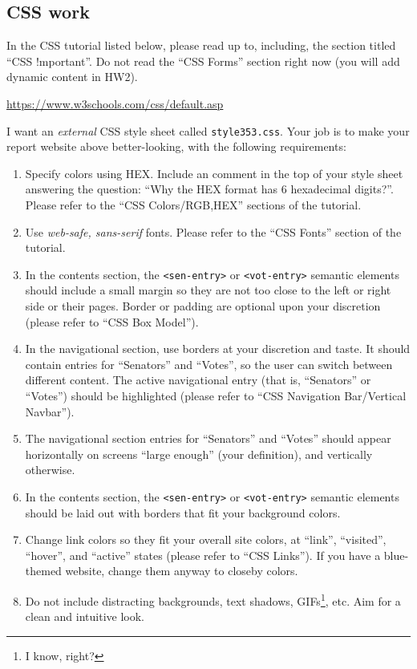 \documentclass[11pt]{article}
\begin{document}
\subsection{CSS work}

In the CSS tutorial listed below, please read up to, including, the section titled ``CSS !mportant''. Do not read the ``CSS Forms'' section right now (you will add dynamic content in HW2).

\begin{center}
	\url{https://www.w3schools.com/css/default.asp}
\end{center}

I want an \emph{external} CSS style sheet called \texttt{style353.css}. Your job is to make your report website above better-looking, with the following requirements:
\begin{enumerate}
	\item Specify colors using HEX. Include an comment in the top of your style sheet answering the question: ``Why the HEX format has 6 hexadecimal digits?''. Please refer to the ``CSS Colors/{RGB,HEX}'' sections of the tutorial.
	\item Use \emph{web-safe, sans-serif} fonts. Please refer to the ``CSS Fonts'' section of the tutorial.
	\item In the contents section, the \texttt{<sen-entry>} or \texttt{<vot-entry>} semantic elements should include a small margin so they are not too close to the left or right side or their pages. Border or padding are optional upon your discretion (please refer to ``CSS Box Model'').
	\item In the navigational section, use borders at your discretion and taste. It should contain entries for ``Senators'' and ``Votes'', so the user can switch between different content. The active navigational entry (that is, ``Senators'' or ``Votes'') should be highlighted (please refer to ``CSS Navigation Bar/Vertical Navbar'').
	\item The navigational section entries for ``Senators'' and ``Votes'' should appear horizontally on screens ``large enough'' (your definition), and vertically otherwise.
	\item In the contents section, the \texttt{<sen-entry>} or \texttt{<vot-entry>} semantic elements should be laid out with borders that fit your background colors.
	\item Change link colors so they fit your overall site colors, at ``link'', ``visited'', ``hover'', and ``active'' states (please refer to ``CSS Links''). If you have a blue-themed website, change them anyway to closeby colors.
	\item Do not include distracting backgrounds, text shadows, GIFs\footnote{I know, right?}, etc. Aim for a clean and intuitive look.
\end{enumerate}
\end{document}
